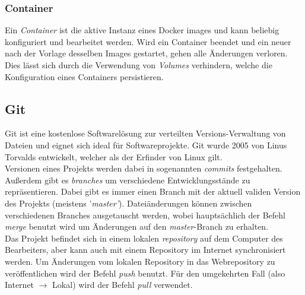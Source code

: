 \documentclass[12pt,twoside,a4paper]{article}
\begin{document}
\begin{sloppypar}
\subsubsection{Container}
Ein \textit{Container} ist die aktive Instanz eines Docker images und kann beliebig konfiguriert und bearbeitet werden. Wird ein Container beendet und ein neuer nach der Vorlage desselben Images gestartet, gehen alle Änderungen verloren. Dies lässt sich durch die Verwendung von \textit{Volumes} verhindern, welche die Konfiguration eines Containers persistieren.
\subsection{Git}
Git ist eine kostenlose Softwarelösung zur verteilten Versions-Verwaltung von Dateien und eignet sich ideal für Softwareprojekte. Git wurde 2005 von Linus Torvalds entwickelt, welcher als der Erfinder von Linux gilt. \cite{linus-torvalds}\\
Versionen eines Projekts werden dabei in sogenannten \textit{commits} festgehalten. Außerdem gibt es \textit{branches} um verschiedene Entwicklungsstände zu repräsentieren. Dabei gibt es immer einen Branch mit der aktuell validen Version des Projekts (meistens '\textit{master'}). Dateiänderungen können zwischen verschiedenen Branches ausgetauscht werden, wobei hauptsächlich der Befehl \textit{merge} benutzt wird um Änderungen auf den \textit{master}-Branch zu erhalten.\\
Das Projekt befindet sich in einem lokalen \textit{repository} auf dem Computer des Bearbeiters, aber kann auch mit einem Repository im Internet synchronisiert werden. Um Änderungen vom lokalen Repository in das Webrepository zu veröffentlichen wird der Befehl \textit{push} benutzt. Für den umgekehrten Fall (also Internet $\rightarrow$ Lokal) wird der Befehl \textit{pull} verwendet.

\end{sloppypar}
\end{document}
